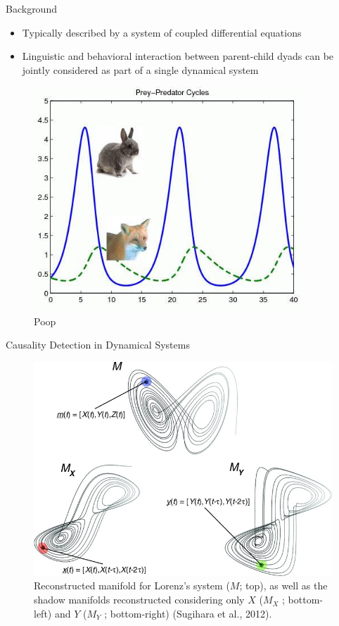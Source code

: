\documentclass[final]{beamer}
\begin{document}
\begin{frame}{}
\begin{textblock}{28}
\begin{block}{Background}
\begin{itemize}
\item \text{ }Typically described by a system of coupled differential equations
\item \text{ }Linguistic and behavioral interaction between parent-child dyads can be jointly considered as part of a single dynamical system
\end{itemize}
\begin{figure}
\includegraphics[width=10cm]{pred_prey.jpg}
\caption{Poop}
\label{fig:predprey}
\end{figure}
\end{block}

\begin{block}{Causality Detection in Dynamical Systems}
\begin{figure}
\includegraphics[width=15cm]{lorenz2.jpg}
\caption{Reconstructed manifold for Lorenz’s system ($M$; top), as well as the shadow manifolds reconstructed considering only $X$ ($M_X$ ; bottom-left) and $Y$ ($M_Y$ ; bottom-right) (Sugihara et al., 2012).}
\label{fig:lorenz}
\end{figure}


\end{block}
\end{textblock}
\end{frame}
\end{document}
